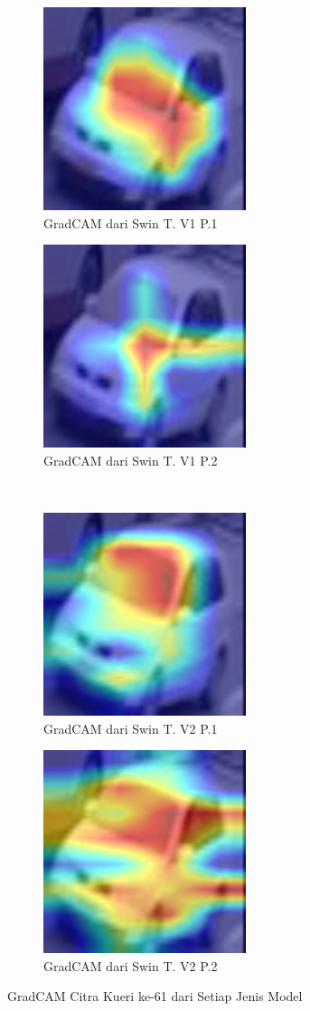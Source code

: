 \begin{figure}[h!]
  \centering
  \begin{subfigure}{.4\textwidth}
    \centering
    \includegraphics[width=.3\linewidth]{gambar/Que61_gradCAMV1P1IT3.jpg}
    \caption{GradCAM dari Swin T. V1 P.1}
    \label{gradcamkuerinomorenamsatuV1P1}
  \end{subfigure}%
  \begin{subfigure}{.4\textwidth}
    \centering
    \includegraphics[width=.3\linewidth]{gambar/Que61_gradCAMV1P2IT2.jpg}
    \caption{GradCAM dari Swin T. V1 P.2}
    \label{gradcamkuerinomorenamsatuV1P2}
  \end{subfigure}%
  \\
  \begin{subfigure}{.4\textwidth}
    \centering
    \includegraphics[width=.3\linewidth]{gambar/Que61_V2P1IT1.png}
    \caption{GradCAM dari Swin T. V2 P.1}
    \label{gradcamkuerinomorenamsatuV2P1}
  \end{subfigure}%
  \begin{subfigure}{.4\textwidth}
    \centering
    \includegraphics[width=.3\linewidth]{gambar/Que61_V2P2IT3.png}
    \caption{GradCAM dari Swin T. V2 P.2}
    \label{gradcamkuerinomorenamsatuV2P2}
  \end{subfigure}
  \caption{GradCAM Citra Kueri ke-61 dari Setiap Jenis Model}
  \label{fig:gradcamdarisetiapjenismodelpengujianketiga}
\end{figure}

